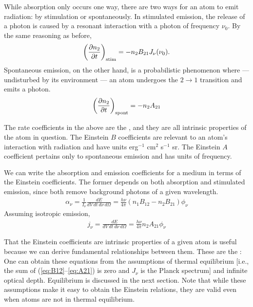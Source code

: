 While absorption only occurs one way, there are two ways for an atom to emit radiation: by stimulation or spontaneously. In stimulated emission, the release of a photon is caused by a resonant interaction with a photon of frequency $\nu_0$. By the same reasoning as before,
\begin{align} \label{eq:B21}
    \left ( \pdv{n_2}{t} \right )_\text{stim} = -n_2 B_{21} J_\nu(\nu_0).
\end{align}
Spontaneous emission, on the other hand, is a probabilistic phenomenon where --- undisturbed by its environment --- an atom undergoes the $2 \to 1$ transition and emits a photon.
\begin{align} \label{eq:A21}
    \left ( \pdv{n_2}{t} \right )_\text{spont} = -n_2 A_{21}
\end{align}

The rate coefficients in the above are the , and they are all intrinsic properties of the atom in question. The Einstein $B$ coefficients are relevant to an atom's interaction with radiation and have units erg$^{-1}$ cm$^2$ s$^{-1}$ sr. The Einstein $A$ coefficient pertains only to spontaneous emission and has units of frequency.

We can write the absorption and emission coefficients for a medium in terms of the Einstein coefficients. The former depends on both absorption and stimulated emission, since both remove background photons of a given wavelength.
\begin{align} \label{eq:absorption-coefficient}
    \alpha_\nu = \frac{1}{I_\nu} \frac{dE}{dV \: dt \: d\nu \: d\Omega} = \frac{h \nu}{4\pi} (n_1 B_{12} - n_2 B_{21}) \phi_\nu
\end{align}
Assuming isotropic emission,
\begin{align} \label{eq:emission-coefficient}
    j_\nu = \frac{dE}{dV \: dt \: d\nu \: d\Omega} = \frac{h \nu}{4\pi} n_2 A_{21} \phi_\nu
\end{align}

That the Einstein coefficients are intrinsic properties of a given atom is useful because we can derive fundamental relationships between them. These are the :
One can obtain these equations from the assumptions of thermal equilibrium [i.e., the sum of (\ref{eq:B12}--\ref{eq:A21}) is zero and $J_\nu$ is the Planck spectrum] and infinite optical depth. Equilibrium is discussed in the next section. Note that while these assumptions make it easy to obtain the Einstein relations, they are valid even when atoms are not in thermal equilibrium.


